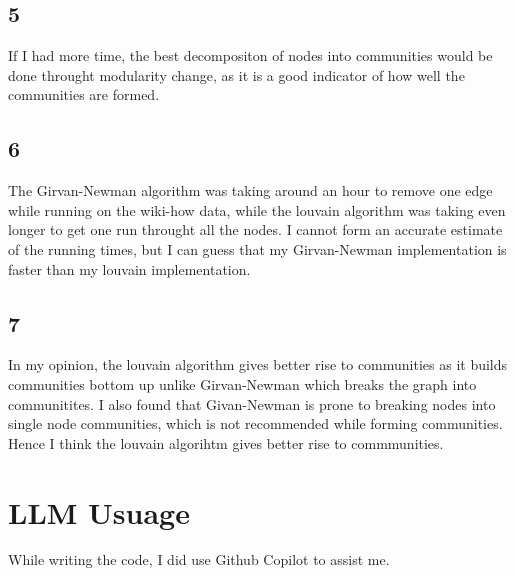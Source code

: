 \documentclass[12pt]{article}
\begin{document}
\subsection*{5}
If I had more time, the best decompositon of nodes into communities would be done throught modularity change, as it is a good indicator of how well the communities are formed.

\subsection*{6}
The Girvan-Newman algorithm was taking around an hour to remove one edge while running on the wiki-how data, while the louvain algorithm was taking even longer to get one run throught all the nodes. I cannot form an accurate estimate of the running times, but I can guess that my Girvan-Newman implementation is faster than my louvain implementation.

\subsection*{7}
In my opinion, the louvain algorithm gives better rise to communities as it builds communities bottom up unlike Girvan-Newman which breaks the graph into communitites. I also found that Givan-Newman is prone to breaking nodes into single node communities, which is not recommended while forming communities. Hence I think the louvain algorihtm gives better rise to commmunities.

\section{LLM Usuage}
While writing the code, I did use Github Copilot to assist me.
\end{document}
